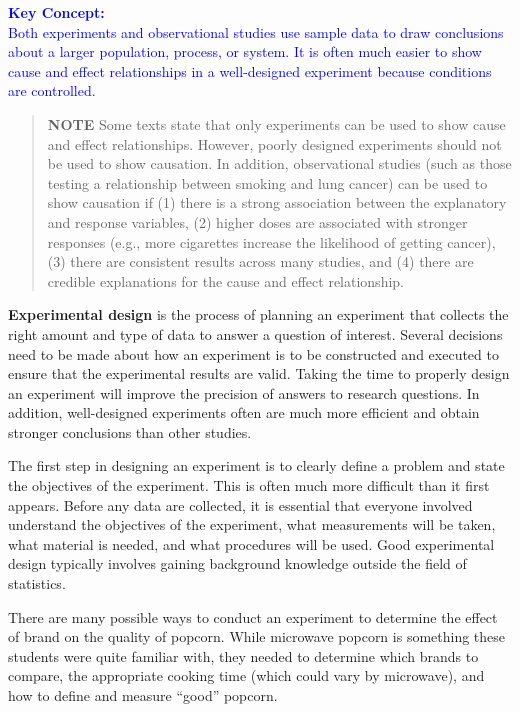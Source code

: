 \documentclass[
]{book}
\begin{document}
\textbf{\textcolor{blue}{Key Concept:}}\\
\textcolor{blue}{Both experiments and observational studies use sample data to draw conclusions about a larger population, process, or system. It is often much easier to show cause and effect relationships in a well-designed experiment because conditions are controlled.}

\begin{quote}
\textbf{NOTE} Some texts state that only experiments can be used to show cause and effect relationships. However, poorly designed experiments should not be used to show causation. In addition, observational studies (such as those testing a relationship between smoking and lung cancer) can be used to show causation if (1) there is a strong association between the explanatory and response variables, (2) higher doses are associated with stronger responses (e.g., more cigarettes increase the likelihood of getting cancer), (3) there are consistent results across many studies, and (4) there are credible explanations for the cause and effect relationship.
\end{quote}

\textbf{Experimental design} is the process of planning an experiment that collects the right amount and type of data to answer a question of interest. Several decisions need to be made about how an experiment is to be constructed and executed to ensure that the experimental results are valid. Taking the time to properly design an experiment will improve the precision of answers to research questions. In addition, well-designed experiments often are much more efficient and obtain stronger conclusions than other studies.

The first step in designing an experiment is to clearly define a problem and state the objectives of the experiment. This is often much more difficult than it first appears. Before any data are collected, it is essential that everyone involved understand the objectives of the experiment, what measurements will be taken, what material is needed, and what procedures will be used. Good experimental design typically involves gaining background knowledge outside the field of statistics.

There are many possible ways to conduct an experiment to determine the effect of brand on the quality of popcorn. While microwave popcorn is something these students were quite familiar with, they needed to determine which brands to compare, the appropriate cooking time (which could vary by microwave), and how to define and measure ``good'' popcorn.
\end{document}
